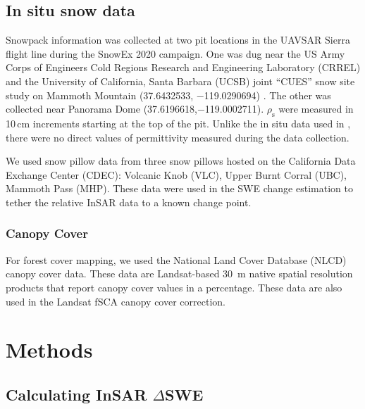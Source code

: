 \hypertarget{ch4-methods-8}{\subsection{In situ snow data}\label{ch4-methods-8}}

Snowpack information was collected at two pit locations in the UAVSAR Sierra flight line during the SnowEx 2020 campaign. One was dug near the US Army Corps of Engineers Cold Regions Research and Engineering Laboratory (CRREL) and the University of California, Santa Barbara (UCSB) joint “CUES” snow site study on Mammoth Mountain (37.6432533, $-$119.0290694) \citep{bairCUESStudySite2015}. The other was collected near Panorama Dome (37.6196618,$-$119.0002711). $\rho_\mathrm{s}$ were measured in 10\,cm increments starting at the top of the pit. Unlike the in situ data used in \cite{tarriconeEstimatingSnowAccumulation2023a}, there were no direct values of permittivity measured during the data collection.

We used snow pillow data from three snow pillows hosted on the California Data Exchange Center (CDEC): Volcanic Knob (VLC), Upper Burnt Corral (UBC), 
Mammoth Pass (MHP). These data were used in the SWE change estimation to tether the relative InSAR data to a known change point.

\hypertarget{ch4-methods-9}{\subsubsection{Canopy Cover}\label{ch4-methods-9}}

For forest cover mapping, we used the National Land Cover Database (NLCD) \citep{homerConterminousUnitedStates2020} canopy cover data. These data are Landsat-based 30~m native spatial resolution products that report canopy cover values in a percentage. These data are also used in the Landsat fSCA canopy cover correction.

\hypertarget{ch4-methods}{\section{Methods}\label{ch4-methods}}
\hypertarget{ch4-methods-1}{\subsection{Calculating InSAR $\Delta$SWE}\label{ch4-methods-1}}

